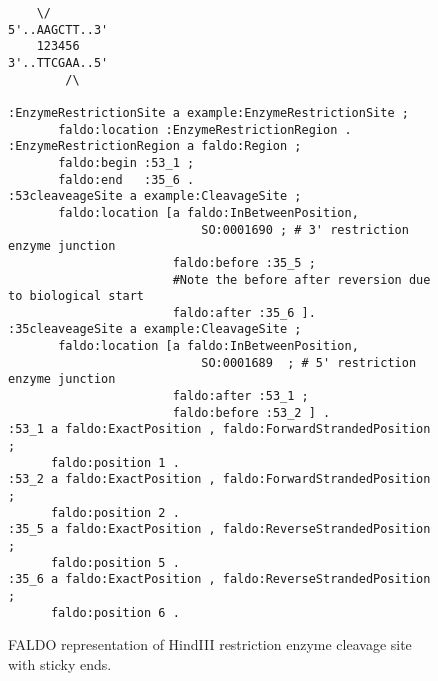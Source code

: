 \begin{figure}
\begin{shaded}
\small
\begin{verbatim}
    \/
5'..AAGCTT..3' 
    123456
3'..TTCGAA..5'
        /\
        
:EnzymeRestrictionSite a example:EnzymeRestrictionSite ;
       faldo:location :EnzymeRestrictionRegion .
:EnzymeRestrictionRegion a faldo:Region ;
       faldo:begin :53_1 ;
       faldo:end   :35_6 .
:53cleaveageSite a example:CleavageSite ;
       faldo:location [a faldo:InBetweenPosition, 
                           SO:0001690 ; # 3' restriction enzyme junction 
                       faldo:before :35_5 ;
                       #Note the before after reversion due to biological start      
                       faldo:after :35_6 ]. 
:35cleaveageSite a example:CleavageSite ;
       faldo:location [a faldo:InBetweenPosition, 
                           SO:0001689  ; # 5' restriction enzyme junction 
                       faldo:after :53_1 ;        
                       faldo:before :53_2 ] .
:53_1 a faldo:ExactPosition , faldo:ForwardStrandedPosition ;
      faldo:position 1 .
:53_2 a faldo:ExactPosition , faldo:ForwardStrandedPosition ;
      faldo:position 2 .
:35_5 a faldo:ExactPosition , faldo:ReverseStrandedPosition ;
      faldo:position 5 .
:35_6 a faldo:ExactPosition , faldo:ReverseStrandedPosition ;
      faldo:position 6 .
\end{verbatim}
\end{shaded}
\caption{FALDO representation of HindIII restriction enzyme cleavage site with sticky ends.}
\label{fig:HindIII}
\end{figure}





